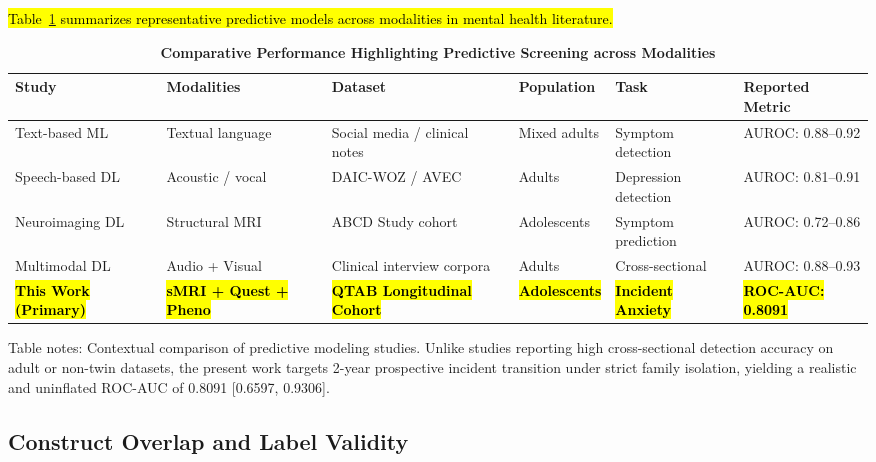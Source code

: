 \documentclass[10pt,letterpaper]{article}
\begin{document}
\hl{Table~\ref{tab:performanceearlyprediction} summarizes representative predictive models across modalities in mental health literature.}

\begin{table}[!t]
\begin{adjustwidth}{-2.25in}{0in}
\centering
\caption{\textbf{Comparative Performance Highlighting Predictive Screening across Modalities}}
\label{tab:performanceearlyprediction}
\footnotesize
\renewcommand{\arraystretch}{1.15}
\begin{tabular}{|p{3.2cm}|p{2.6cm}|p{3.6cm}|p{2.2cm}|p{2.2cm}|p{2.2cm}|}
\hline
\textbf{Study} & \textbf{Modalities} & \textbf{Dataset} & \textbf{Population} & \textbf{Task} & \textbf{Reported Metric} \\
\hline
Text-based ML~\cite{ref11,ref17} & Textual language & Social media / clinical notes & Mixed adults & Symptom detection & AUROC: 0.88--0.92 \\
\hline
Speech-based DL~\cite{ref14,ref27} & Acoustic / vocal & DAIC-WOZ / AVEC & Adults & Depression detection & AUROC: 0.81--0.91 \\
\hline
Neuroimaging DL~\cite{ref46} & Structural MRI & ABCD Study cohort & Adolescents & Symptom prediction & AUROC: 0.72--0.86 \\
\hline
Multimodal DL~\cite{ref5,ref7,ref8} & Audio + Visual & Clinical interview corpora & Adults & Cross-sectional & AUROC: 0.88--0.93 \\
\hline
\textbf{\hl{This Work (Primary)}} & \textbf{\hl{sMRI + Quest + Pheno}} & \textbf{\hl{QTAB Longitudinal Cohort}} & \textbf{\hl{Adolescents}} & \textbf{\hl{Incident Anxiety}} & \textbf{\hl{ROC-AUC: 0.8091}} \\
\hline
\end{tabular}
\begin{flushleft}
Table notes: Contextual comparison of predictive modeling studies. Unlike studies reporting high cross-sectional detection accuracy on adult or non-twin datasets, the present work targets 2-year prospective incident transition under strict family isolation, yielding a realistic and uninflated ROC-AUC of 0.8091 [0.6597, 0.9306].
\end{flushleft}
\end{adjustwidth}
\end{table}

\subsection*{Construct Overlap and Label Validity}
\end{document}
